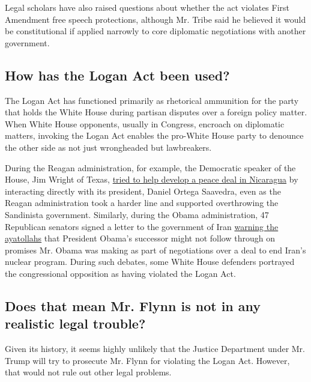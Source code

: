 Legal scholars have also raised questions about whether the act violates
First Amendment free speech protections, although Mr. Tribe said he
believed it would be constitutional if applied narrowly to core
diplomatic negotiations with another government.

\hypertarget{how-has-the-logan-act-been-used}{%
\subsection{How has the Logan Act been
used?}\label{how-has-the-logan-act-been-used}}

The Logan Act has functioned primarily as rhetorical ammunition for the
party that holds the White House during partisan disputes over a foreign
policy matter. When White House opponents, usually in Congress, encroach
on diplomatic matters, invoking the Logan Act enables the pro-White
House party to denounce the other side as not just wrongheaded but
lawbreakers.

During the Reagan administration, for example, the Democratic speaker of
the House, Jim Wright of Texas,
\href{http://www.nytimes.com/1987/11/15/weekinreview/peace-salvo-sandinistas-launch-an-offensive-on-capitol-hill.html}{tried
to help develop a peace deal in Nicaragua} by interacting directly with
its president, Daniel Ortega Saavedra, even as the Reagan administration
took a harder line and supported overthrowing the Sandinista government.
Similarly, during the Obama administration, 47 Republican senators
signed a letter to the government of Iran
\href{https://www.nytimes.com/2015/03/10/world/asia/white-house-faults-gop-senators-letter-to-irans-leaders.html}{warning
the ayatollahs} that President Obama's successor might not follow
through on promises Mr. Obama was making as part of negotiations over a
deal to end Iran's nuclear program. During such debates, some White
House defenders portrayed the congressional opposition as having
violated the Logan Act.

\hypertarget{does-that-mean-mr-flynn-is-not-in-any-realistic-legal-trouble}{%
\subsection{Does that mean Mr. Flynn is not in any realistic legal
trouble?}\label{does-that-mean-mr-flynn-is-not-in-any-realistic-legal-trouble}}

Given its history, it seems highly unlikely that the Justice Department
under Mr. Trump will try to prosecute Mr. Flynn for violating the Logan
Act. However, that would not rule out other legal problems.

